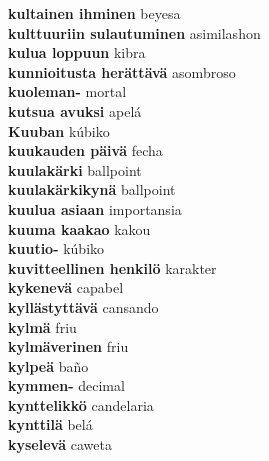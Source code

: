 \textbf{ kultainen ihminen  } beyesa \\
\textbf{ kulttuuriin sulautuminen  } asimilashon \\
\textbf{ kulua loppuun  } kibra \\
\textbf{ kunnioitusta herättävä  } asombroso \\
\textbf{ kuoleman-  } mortal \\
\textbf{ kutsua avuksi  } apelá \\
\textbf{ Kuuban  } kúbiko \\
\textbf{ kuukauden päivä  } fecha \\
\textbf{ kuulakärki  } ballpoint \\
\textbf{ kuulakärkikynä  } ballpoint \\
\textbf{ kuulua asiaan  } importansia \\
\textbf{ kuuma kaakao  } kakou \\
\textbf{ kuutio-  } kúbiko \\
\textbf{ kuvitteellinen henkilö  } karakter \\
\textbf{ kykenevä  } capabel \\
\textbf{ kyllästyttävä  } cansando \\
\textbf{ kylmä  } friu \\
\textbf{ kylmäverinen  } friu \\
\textbf{ kylpeä  } baño \\
\textbf{ kymmen-  } decimal \\
\textbf{ kynttelikkö  } candelaria \\
\textbf{ kynttilä  } belá \\
\textbf{ kyselevä  } caweta \\
